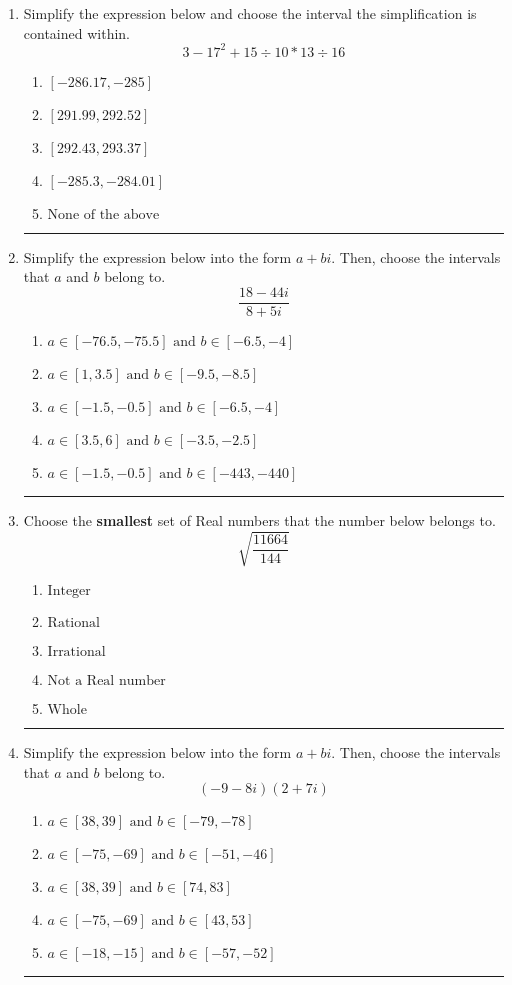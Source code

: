 \documentclass[14pt]{extbook}
\newcommand{\litem}[1]{\item#1\hspace*{-1cm}\rule{\textwidth}{0.4pt}}
\begin{document}
\begin{enumerate}
{\begin{enumerate}[label=\Alph*.]
\end{enumerate} }
\litem{
Simplify the expression below and choose the interval the simplification is contained within.\[ 3 - 17^2 + 15 \div 10 * 13 \div 16 \]\begin{enumerate}[label=\Alph*.]
\item \( [-286.17, -285] \)
\item \( [291.99, 292.52] \)
\item \( [292.43, 293.37] \)
\item \( [-285.3, -284.01] \)
\item \( \text{None of the above} \)

\end{enumerate} }
\litem{
Simplify the expression below into the form $a+bi$. Then, choose the intervals that $a$ and $b$ belong to.\[ \frac{18 - 44 i}{8 + 5 i} \]\begin{enumerate}[label=\Alph*.]
\item \( a \in [-76.5, -75.5] \text{ and } b \in [-6.5, -4] \)
\item \( a \in [1, 3.5] \text{ and } b \in [-9.5, -8.5] \)
\item \( a \in [-1.5, -0.5] \text{ and } b \in [-6.5, -4] \)
\item \( a \in [3.5, 6] \text{ and } b \in [-3.5, -2.5] \)
\item \( a \in [-1.5, -0.5] \text{ and } b \in [-443, -440] \)

\end{enumerate} }
\litem{
Choose the \textbf{smallest} set of Real numbers that the number below belongs to.\[ \sqrt{\frac{11664}{144}} \]\begin{enumerate}[label=\Alph*.]
\item \( \text{Integer} \)
\item \( \text{Rational} \)
\item \( \text{Irrational} \)
\item \( \text{Not a Real number} \)
\item \( \text{Whole} \)

\end{enumerate} }
\litem{
Simplify the expression below into the form $a+bi$. Then, choose the intervals that $a$ and $b$ belong to.\[ (-9 - 8 i)(2 + 7 i) \]\begin{enumerate}[label=\Alph*.]
\item \( a \in [38, 39] \text{ and } b \in [-79, -78] \)
\item \( a \in [-75, -69] \text{ and } b \in [-51, -46] \)
\item \( a \in [38, 39] \text{ and } b \in [74, 83] \)
\item \( a \in [-75, -69] \text{ and } b \in [43, 53] \)
\item \( a \in [-18, -15] \text{ and } b \in [-57, -52] \)


\end{enumerate}}
\end{enumerate}
\end{document}
